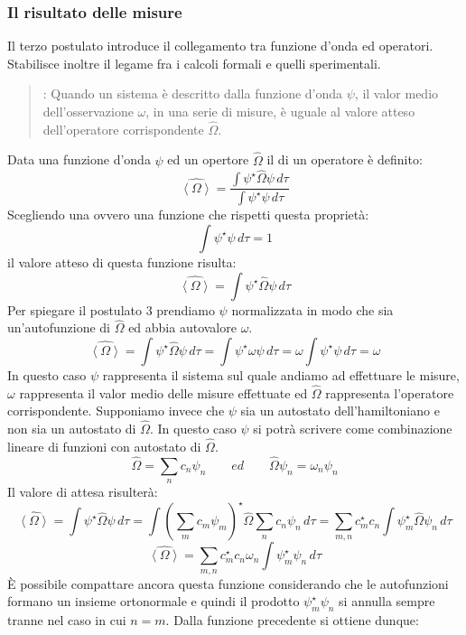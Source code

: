 \subsubsection{Il risultato delle misure}
Il terzo postulato introduce il collegamento tra funzione d'onda ed operatori. Stabilisce inoltre il legame fra i calcoli formali e quelli sperimentali.
\begin{quote}
: Quando un sistema è descritto dalla funzione d'onda $\psi$, il valor medio dell'osservazione $\omega$, in una serie di misure, è uguale al valore atteso dell'operatore corrispondente $\hat{\Omega}$.
\end{quote}
Data una funzione d'onda $\psi$ ed un opertore $\hat{\Omega}$ il  di un operatore è definito:
$$\hat{\left \langle \Omega \right \rangle} = \frac{ \int \psi^{\star} \hat{\Omega} \psi \,d\tau }{ \int \psi^{\star} \psi \,d\tau }$$
Scegliendo una  ovvero una funzione che rispetti questa proprietà:
$$\int \psi^{\star} \psi \,d\tau = 1$$
il valore atteso di questa funzione risulta:
$$\hat{\left \langle \Omega \right \rangle} = \int \psi^{\star} \hat{\Omega} \psi \,d\tau$$
Per spiegare il postulato 3 prendiamo $\psi$ normalizzata in modo che sia un'autofunzione di $\hat{\Omega}$ ed abbia autovalore $\omega$.
$$\hat{\left \langle \Omega \right \rangle} = \int \psi^{\star} \hat{\Omega} \psi \,d\tau = \int \psi^{\star} \omega \psi \,d\tau = \omega \int \psi^{\star} \psi \,d\tau = \omega$$
In questo caso $\psi$ rappresenta il sistema sul quale andiamo ad effettuare le misure, $\omega$ rappresenta il valor medio delle misure effettuate ed $\hat{\Omega}$ rappresenta l'operatore corrispondente.
Supponiamo invece che $\psi$ sia un autostato dell'hamiltoniano e non sia un autostato di $\hat{\Omega}$. In questo caso $\psi$ si potrà scrivere come combinazione lineare di funzioni con autostato di $\hat{\Omega}$.
$$\hat{\Omega} = \sum_n c_n \psi_n \qquad ed \qquad \hat{\Omega} \psi_n = \omega_n \psi_n$$
Il valore di attesa risulterà:
$$\hat{\left \langle \Omega \right \rangle} = \int \psi^{\star} \hat{\Omega} \psi \,d\tau = \int {\left(\sum_m c_m \psi_m\right)}^{\star} \hat{\Omega} \sum_n c_n \psi_n \,d\tau = \sum_{m,n} c_m^{\star} c_n \int \psi_m^{\star} \hat{\Omega} \psi_n \, d\tau$$
$$\hat{\left \langle \Omega \right \rangle} = \sum_{m,n} c_m^{\star} c_n \omega_n \int \psi_m^{\star} \psi_n \, d\tau$$
È possibile compattare ancora questa funzione considerando che le autofunzioni formano un insieme ortonormale e quindi il prodotto $\psi_m^{\star} \psi_n$ si annulla sempre tranne nel caso in cui $n = m$. Dalla funzione precedente si ottiene dunque:

